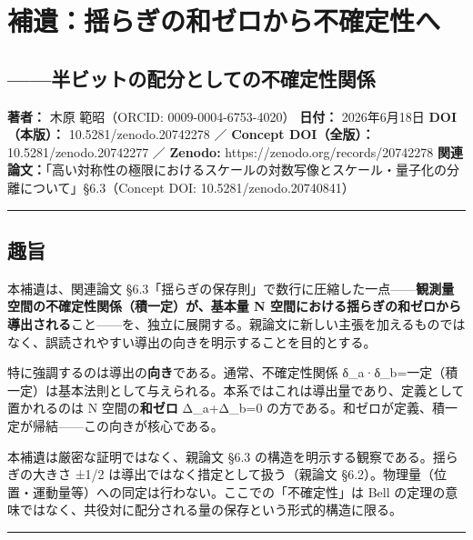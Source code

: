 \documentclass[11pt]{ltjsarticle}
\begin{document}
\section{補遺：揺らぎの和ゼロから不確定性へ}\label{ux88dcux907aux63faux3089ux304eux306eux548cux30bcux30edux304bux3089ux4e0dux78baux5b9aux6027ux3078}

\subsection{------半ビットの配分としての不確定性関係}\label{ux534aux30d3ux30c3ux30c8ux306eux914dux5206ux3068ux3057ux3066ux306eux4e0dux78baux5b9aux6027ux95a2ux4fc2}

\textbf{著者：} 木原 範昭（ORCID: 0009-0004-6753-4020） \textbf{日付：}
2026年6月18日 \textbf{DOI（本版）：} 10.5281/zenodo.20742278 ／
\textbf{Concept DOI（全版）：} 10.5281/zenodo.20742277 ／
\textbf{Zenodo:} https://zenodo.org/records/20742278
\textbf{関連論文：}「高い対称性の極限におけるスケールの対数写像とスケール・量子化の分離について」§6.3（Concept
DOI: 10.5281/zenodo.20740841）

\begin{center}\rule{0.5\linewidth}{0.5pt}\end{center}

\subsection{趣旨}\label{ux8da3ux65e8}

本補遺は、関連論文
§6.3「揺らぎの保存則」で数行に圧縮した一点------\textbf{観測量空間の不確定性関係（積一定）が、基本量
N
空間における揺らぎの和ゼロから導出される}こと------を、独立に展開する。親論文に新しい主張を加えるものではなく、誤読されやすい導出の向きを明示することを目的とする。

特に強調するのは導出の\textbf{向き}である。通常、不確定性関係
δ\_a·δ\_b=一定（積一定）は基本法則として与えられる。本系ではこれは導出量であり、定義として置かれるのは
N 空間の\textbf{和ゼロ} Δ\_a+Δ\_b=0
の方である。和ゼロが定義、積一定が帰結------この向きが核心である。

本補遺は厳密な証明ではなく、親論文 §6.3
の構造を明示する観察である。揺らぎの大きさ ±1/2
は導出ではなく措定として扱う（親論文
§6.2）。物理量（位置・運動量等）への同定は行わない。ここでの「不確定性」は
Bell
の定理の意味ではなく、共役対に配分される量の保存という形式的構造に限る。

\begin{center}\rule{0.5\linewidth}{0.5pt}\end{center}
\end{document}

